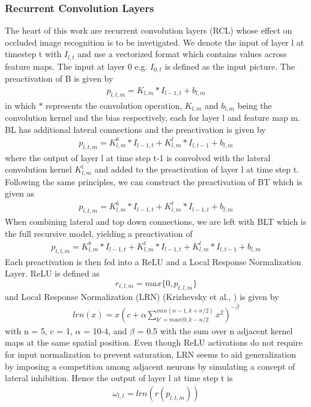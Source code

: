 \subsubsection{Recurrent Convolution Layers}
The heart of this work are recurrent convolution layers (RCL) whose effect on occluded image recognition is to be invetigated. We denote the input of layer l at timestep t with $I_{l, t}$ and use a vectorized format which contains values across feature maps. The input at layer 0 e.g. $I_{0, t}$ is defined as the input picture. The preactivation of B is given by\begin{align*}
	p_{l, t, m} = K_{l, m} * I_{l-1, t} + b_{l, m}
\end{align*}
in which $*$ represents the convolution operation, $K_{l, m}$ and $b_{l, m}$ being the convolution kernel and the bias respectively, each for layer l and feature map m.\\
BL has additional lateral connections and the preactivation is given by \begin{align*}
	p_{l, t, m} = K^b_{l, m} * I_{l-1, t} + K^l_{l, m} * I_{l, t-1}  + b_{l, m} 	
\end{align*}
where the output of layer l at time step t-1 is convolved with the lateral convolution kernel $K^l_{l, m}$ and added to the preactivation of layer l at time step t. Following the same principles, we can construct the preactivation of BT which is given as
\begin{align*}
	p_{l, t, m} = K^b_{l, m} * I_{l-1, t} + K^t_{l, m} * I_{l-1, t}  + b_{l, m}
\end{align*}
When combining lateral and top down connections, we are left with BLT which is the full recursive model, yielding a preactivation of
\begin{align*}
	p_{t, l, m} = K^b_{l, m} * I_{l-1, t} + K^t_{l, m} * I_{l-1, t}  + K^l_{l, m} * I_{l, t-1} + b_{l, m}
\end{align*}
Each preactivation is then fed into a ReLU and a Local Response Normalization Layer. ReLU is defined as $$r_{t, l, m} = max\{0, p_{t, l, m}\}$$
and Local Response Normalization (LRN) (Krizhevsky et al., \cite{NIPS2012_4824}) is given by 
\begin{align*}
	lrn(x) = x\left(c+\alpha\sum_{k'=max(0, k-n/2}^{min(n-1, k+n/2)}x^2\right)^{-\beta}
\end{align*}
with n = 5, c = 1, $\alpha$ = 10-4, and $\beta$ = 0.5 with the sum over n adjacent kernel maps at the same spatial position. Even though ReLU activations do not require for input normalization to prevent saturation, LRN seems to aid generalization by imposing a competition among adjacent neurons by simulating a concept of lateral inhibition. Hence the output of layer l at time step t is 
\begin{align*}
	\omega_{l, t} = lrn(r(p_{l, t, m}))
\end{align*}
\
